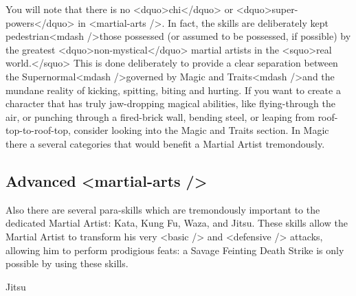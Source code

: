 You will note that there is no <dquo>chi</dquo> or <dquo>super-powers</dquo> in
<martial-arts />. In fact, the skills are deliberately kept
pedestrian<mdash />those possessed (or assumed to be possessed, if possible)
by the greatest <dquo>non-mystical</dquo> martial artists in the <squo>real world.</squo>
This is done deliberately to provide a clear separation between the
Supernormal<mdash />governed by Magic and Traits<mdash />and the
mundane reality of kicking, spitting, biting and hurting. If
you want to create a character that has truly jaw-dropping magical
abilities, like flying-through the air, or punching through a
fired-brick wall, bending steel, or leaping from roof-top-to-roof-top,
consider looking into the Magic and Traits section. In
Magic there a several categories that would benefit a Martial
Artist tremondously.

\subsection{Advanced <martial-arts />}
\label{sec:adv-ma}

Also there are several para-skills which are tremondously
important to the dedicated Martial Artist: Kata,
Kung Fu, Waza, and Jitsu. These skills allow the
Martial Artist to transform his very <basic /> and <defensive /> attacks,
allowing him to perform prodigious feats: a Savage Feinting Death
Strike is only possible by using these skills.

\begin{description}
\item[Jitsu] 
\end{description}
